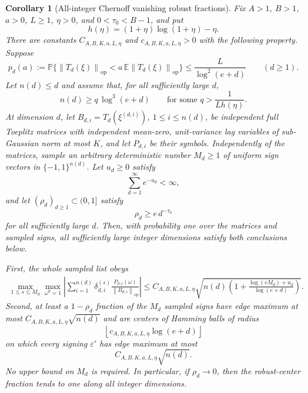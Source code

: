\documentclass[11pt]{amsart}
\numberwithin{equation}{section}
\newtheorem{corollary}[theorem]{Corollary}
\theoremstyle{definition}
\theoremstyle{remark}
\newcommand{\op}{\mathrm{op}}
\newcommand{\Prob}{\mathbb P}
\newcommand{\Exp}{\mathbb E}
\newcommand{\norm}[1]{\left\lVert #1\right\rVert}
\newcommand{\eps}{\varepsilon}
\begin{document}
\begin{corollary}[All-integer Chernoff vanishing robust fractions]
\label{cor:normalizer-tail-chernoff-borel-integer-vanishing-fractions}
Fix \(A>1\), \(B>1\), \(a>0\), \(L\ge1\), \(\eta>0\), and \(0<\tau_0<B-1\), and put
\[
  h(\eta)=(1+\eta)\log(1+\eta)-\eta .
\]
There are constants \(C_{A,B,K,a,L,\eta}\) and \(c_{A,B,K,a,L,\eta}>0\) with the
following property.  Suppose
\[
  p_d(a):=\Prob\{\norm{T_d(\xi)}_{\op}
      <a\,\Exp\norm{T_d(\xi)}_{\op}\}
  \le \frac{L}{\log^2(e+d)}
  \qquad(d\ge1).
\]
Let \(n(d)\le d\) and assume that, for all sufficiently large \(d\),
\[
  n(d)\ge q\,\log^3(e+d)
  \qquad\text{for some } q>\frac1{Lh(\eta)} .
\]
At dimension \(d\), let \(B_{d,i}=T_d(\xi^{(d,i)})\), \(1\le i\le n(d)\), be
independent full Toeplitz matrices with independent mean-zero, unit-variance
lag variables of sub-Gaussian norm at most \(K\), and let \(P_{d,i}\) be their
symbols.  Independently of the matrices, sample an arbitrary deterministic
number \(M_d\ge1\) of uniform sign vectors in \(\{-1,1\}^{n(d)}\).  Let
\(u_d\ge0\) satisfy
\[
  \sum_{d=1}^{\infty}e^{-u_d}<\infty ,
\]
and let \((\rho_d)_{d\ge1}\subset(0,1]\) satisfy
\[
  \rho_d\ge e\,d^{-\tau_0}
\]
for all sufficiently large \(d\).  Then, with probability one over the matrices
and sampled signs, all sufficiently large integer dimensions satisfy both
conclusions below.

First, the whole sampled list obeys
\[
\begin{aligned}
  \max_{1\le s\le M_d}\max_{\omega^d=1}
  \left|\sum_{i=1}^{n(d)}\delta_{d,i}^{(s)}
  \frac{P_{d,i}(\omega)}{\norm{B_{d,i}}_{\op}}\right|
  \le
  C_{A,B,K,a,L,\eta}\sqrt{
    n(d)\left(1+\frac{\log(eM_d)+u_d}{\log(e+d)}\right)} .
\end{aligned}
\]
Second, at least a \(1-\rho_d\) fraction of the \(M_d\) sampled signs have edge
maximum at most \(C_{A,B,K,a,L,\eta}\sqrt{n(d)}\) and are centers of Hamming
balls of radius
\[
  \left\lfloor c_{A,B,K,a,L,\eta}\log(e+d)\right\rfloor
\]
on which every signing \(\eps'\) has edge maximum at most
\[
  C_{A,B,K,a,L,\eta}\sqrt{n(d)}.
\]
No upper bound on \(M_d\) is required.  In particular, if \(\rho_d\to0\), then
the robust-center fraction tends to one along all integer dimensions.
\end{corollary}
\end{document}
